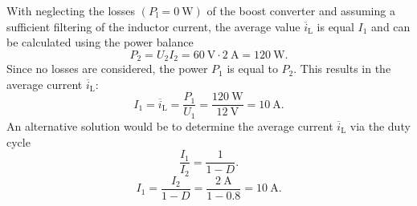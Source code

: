 \begin{solutionblock}
    With neglecting the losses $(P_{\mathrm{l}} = \SI{0}{\watt})$ of the boost converter and assuming a sufficient filtering of the inductor current, the average value $\overline i_{\mathrm{L}}$ is equal $I_{\mathrm{1}}$ and can be calculated using the power balance
    \begin{equation}
        P_{\mathrm{2}} = U_{\mathrm{2}} I_{\mathrm{2}} = {\SI{60}{\volt}} \cdot {\SI{2}{\ampere}} = {\SI{120}{\watt}}.
    \end{equation}
    Since no losses are considered, the power  $P_{\mathrm{1}}$ is equal to  $P_{\mathrm{2}}$.
    This results in the average current $\overline i_{\mathrm{L}}$:
    \begin{equation}
         I_{\mathrm{1}} = \overline i_{\mathrm{L}} = \frac{P_{\mathrm{1}}}{U_{\mathrm{1}}}= \frac{\SI{120}{\watt}}{\SI{12}{\volt}} = \SI{10}{\ampere}.
    \end{equation}
    An alternative solution would be to determine the average current $\overline i_{\mathrm{L}}$ via the duty cycle
    \begin{equation}
    \frac{I_{\mathrm{1}}}{I_{\mathrm{2}}}=\frac{1}{1-D}.
    \end{equation}
    \begin{equation}
     I_{\mathrm{1}}=\frac{I_{\mathrm{2}}}{1-D}=\frac{\SI{2}{\ampere}}{1-0.8}= \SI{10}{\ampere}.
    \end{equation}
\end{solutionblock}

